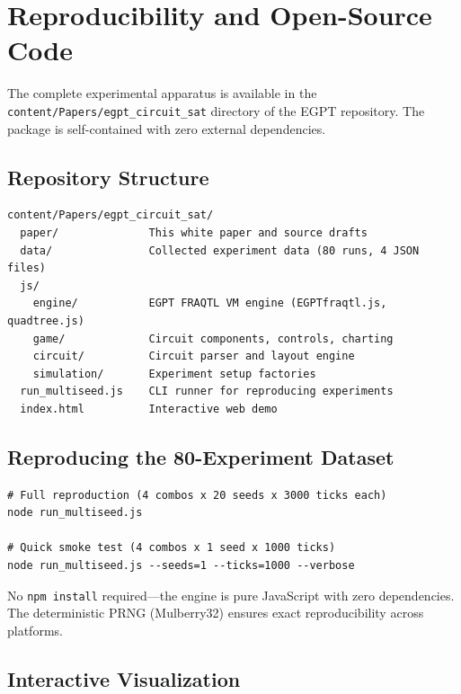 \documentclass[11pt,a4paper]{article}
\begin{document}
\appendix

\section{Reproducibility and Open-Source Code}
\label{app:reproduce}

The complete experimental apparatus is available in the \texttt{content/Papers/egpt\_circuit\_sat} directory of the EGPT repository. The package is self-contained with zero external dependencies.

\subsection{Repository Structure}

\begin{verbatim}
content/Papers/egpt_circuit_sat/
  paper/              This white paper and source drafts
  data/               Collected experiment data (80 runs, 4 JSON files)
  js/
    engine/           EGPT FRAQTL VM engine (EGPTfraqtl.js, quadtree.js)
    game/             Circuit components, controls, charting
    circuit/          Circuit parser and layout engine
    simulation/       Experiment setup factories
  run_multiseed.js    CLI runner for reproducing experiments
  index.html          Interactive web demo
\end{verbatim}

\subsection{Reproducing the 80-Experiment Dataset}

\begin{verbatim}
# Full reproduction (4 combos x 20 seeds x 3000 ticks each)
node run_multiseed.js

# Quick smoke test (4 combos x 1 seed x 1000 ticks)
node run_multiseed.js --seeds=1 --ticks=1000 --verbose
\end{verbatim}

No \texttt{npm install} required---the engine is pure JavaScript with zero dependencies. The deterministic PRNG (Mulberry32) ensures exact reproducibility across platforms.

\subsection{Interactive Visualization}
\end{document}
